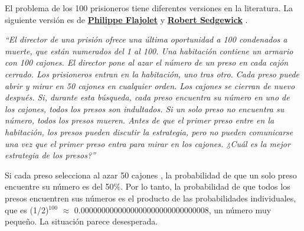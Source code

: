 El problema de los 100 prisioneros tiene diferentes versiones en la literatura. La siguiente versión es de \href{https://en.wikipedia.org/wiki/Philippe_Flajolet}{\textbf{Philippe Flajolet}} y \href{https://en.wikipedia.org/wiki/Robert_Sedgewick_(computer_scientist)}{\textbf{Robert Sedgewick}} \cite{flajolet2009analytic}.

\textit{``El director de una prisión ofrece una última oportunidad a 100 condenados a muerte, que están numerados del 1 al 100. Una habitación contiene un armario con 100 cajones. El director pone al azar el número de un preso en cada cajón cerrado. Los prisioneros entran en la habitación, uno tras otro. Cada preso puede abrir y mirar en 50 cajones en cualquier orden. Los cajones se cierran de nuevo después. Si, durante esta búsqueda, cada preso encuentra su número en uno de los cajones, todos los presos son indultados. Si un solo preso no encuentra su número, todos los presos mueren. Antes de que el primer preso entre en la habitación, los presos pueden discutir la estrategia, pero no pueden comunicarse una vez que el primer preso entra para mirar en los cajones. ¿Cuál es la mejor estrategia de los presos?''}

Si cada preso selecciona al azar 50 cajones , la probabilidad de que un solo preso encuentre su número es del 50\%. Por lo tanto, la probabilidad de que todos los presos encuentren sus números es el producto de las probabilidades individuales, que es (1/2)$^{100}$ $\approx$ 0.0000000000000000000000000000008, un número muy pequeño. La situación parece desesperada.